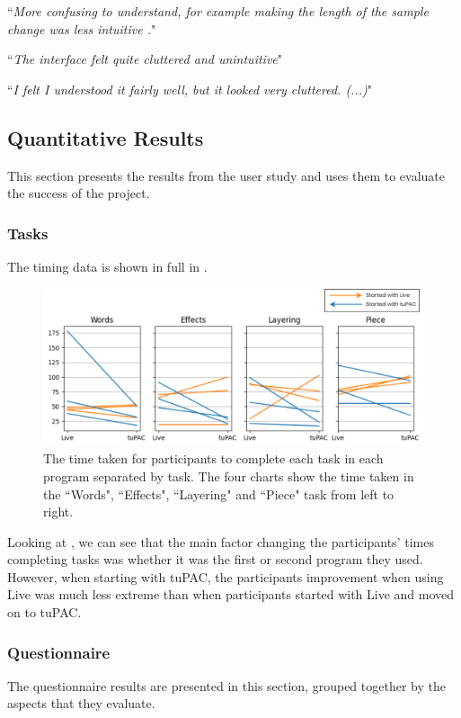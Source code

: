 \documentclass[12pt,a4paper,oneside,openright]{report}
\newcommand{\quoteT}[1]{``\textit{#1}"}
\begin{document}
\quoteT{More confusing to understand, for example making the length of the sample change was less intuitive .}

\quoteT{The interface felt quite cluttered and unintuitive}

\quoteT{I felt I understood it fairly well, but it looked very cluttered. (...)}

\subsection{Quantitative Results}\label{sec:data}
This section presents the results from the user study and uses them to evaluate the success of the project.

\subsubsection{Tasks}
The timing data is shown in full in .

\begin{figure}[h]
    \centering
    \includegraphics[scale=0.25]{images/time_data.png}
    \caption{The time taken for participants to complete each task in each program separated by task. The four charts show the time taken in the ``Words", ``Effects", ``Layering" and ``Piece" task from left to right.}
    \label{fig:change_per_task}
\end{figure}

Looking at , we can see that the main factor changing the participants' times completing tasks was whether it was the first or second program they used. However, when starting with tuPAC, the participants improvement when using Live was much less extreme than when participants started with Live and moved on to tuPAC.

\clearpage
\subsubsection{Questionnaire}
The questionnaire results are presented in this section, grouped together by the aspects that they evaluate.
\end{document}
